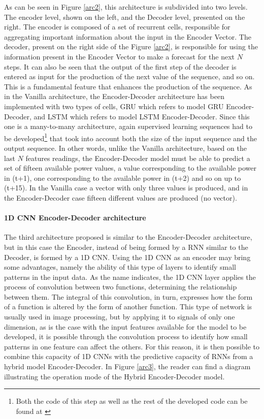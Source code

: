 As can be seen in Figure \ref{arc2}, this architecture is subdivided into two levels. The encoder level, shown on the left, and the Decoder level, presented on the right. The encoder is composed of a set of recurrent cells, responsible for aggregating important information about the input in the Encoder Vector. The decoder, present on the right side of the Figure \ref{arc2}, is responsible for using the information present in the Encoder Vector to make a forecast for the next $N$ steps. It can also be seen that the output of the first step of the decoder is entered as input for the production of the next value of the sequence, and so on. This is a fundamental feature that enhances the production of the sequence. As in the Vanilla architecture, the Encoder-Decoder architecture has been implemented with two types of cells, \ac{GRU} which refers to model \ac{GRU} Encoder-Decoder, and \ac{LSTM} which refers to model \ac{LSTM} Encoder-Decoder. Since this one is a many-to-many architecture, again supervised learning sequences had to be developed\footnote{Both the code of this step as well as the rest of the developed code can be found at \cite{code}} that took into account both the size of the input sequence and the output sequence. In other words, unlike the Vanilla architecture, based on the last $N$ features readings, the Encoder-Decoder model must be able to predict a set of fifteen available power values, a value corresponding to the available power in (t+1), one corresponding to the available power in (t+2) and so on up to (t+15). In the Vanilla case a vector with only three values is produced, and in the Encoder-Decoder case fifteen different values are produced (no vector).




\paragraph*{1D CNN Encoder-Decoder architecture}


The third architecture proposed is similar to the Encoder-Decoder architecture, but in this case the Encoder, instead of being formed by a \ac{RNN} similar to the Decoder, is formed by a \ac{1D CNN}. Using the \ac{1D CNN} as an encoder may bring some advantages, namely the ability of this type of layers to identify small patterns in the input data. As the name indicates, the \ac{1D CNN} layer applies the process of convolution between two functions, determining the relationship between them. The integral of this convolution, in turn, expresses how the form of a function is altered by the form of another function. This type of network is usually used in image processing, but by applying it to signals of only one dimension, as is the case with the input features available for the model to be developed, it is possible through the convolution process to identify how small patterns in one feature can affect the others. For this reason, it is then possible to combine this capacity of \ac{1D CNN}s with the predictive capacity of \ac{RNN}s from a hybrid model Encoder-Decoder. In Figure \ref{arc3}, the reader can find a diagram illustrating the operation mode of the Hybrid Encoder-Decoder model.

